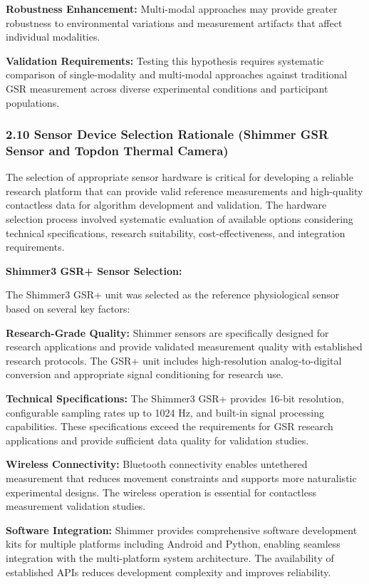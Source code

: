\documentclass[12pt,a4paper]{report}
\begin{document}
\textbf{Robustness Enhancement:} Multi-modal approaches may provide greater robustness to environmental variations and
measurement artifacts that affect individual modalities.

\textbf{Validation Requirements:} Testing this hypothesis requires systematic comparison of single-modality and multi-modal
approaches against traditional GSR measurement across diverse experimental conditions and participant populations.

\subsubsection{2.10 Sensor Device Selection Rationale (Shimmer GSR Sensor and Topdon Thermal Camera)}

The selection of appropriate sensor hardware is critical for developing a reliable research platform that can provide
valid reference measurements and high-quality contactless data for algorithm development and validation. The hardware
selection process involved systematic evaluation of available options considering technical specifications, research
suitability, cost-effectiveness, and integration requirements.

\textbf{Shimmer3 GSR+ Sensor Selection:}

The Shimmer3 GSR+ unit was selected as the reference physiological sensor based on several key factors:

\textbf{Research-Grade Quality:} Shimmer sensors are specifically designed for research applications and provide validated
measurement quality with established research protocols. The GSR+ unit includes high-resolution analog-to-digital
conversion and appropriate signal conditioning for research use.

\textbf{Technical Specifications:} The Shimmer3 GSR+ provides 16-bit resolution, configurable sampling rates up to 1024 Hz,
and built-in signal processing capabilities. These specifications exceed the requirements for GSR research applications
and provide sufficient data quality for validation studies.

\textbf{Wireless Connectivity:} Bluetooth connectivity enables untethered measurement that reduces movement constraints and
supports more naturalistic experimental designs. The wireless operation is essential for contactless measurement
validation studies.

\textbf{Software Integration:} Shimmer provides comprehensive software development kits for multiple platforms including
Android and Python, enabling seamless integration with the multi-platform system architecture. The availability of
established APIs reduces development complexity and improves reliability.
\end{document}
